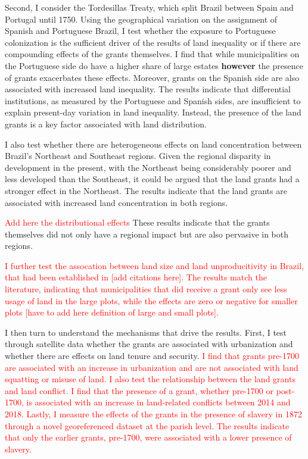 \documentclass[11pt]{article}
\newcommand{\red}[1]{\textcolor{red}{#1}}
\begin{document}
Second, I consider the Tordesillas Treaty, which split Brazil between Spain and Portugal until 1750. 
Using the geographical variation on the assignment of Spanish and Portuguese Brazil, I test whether the exposure to Portuguese colonization is the sufficient driver of the results of land inequality or if there are compounding effects of the grants themselves.
I find that while municipalities on the Portuguese side do have a higher share of large estates \textbf{however} the presence of grants exacerbates these effects.
Moreover, grants on the Spanish side are also associated with increased land inequality.
The results indicate that differential institutions, as measured by the Portuguese and Spanish sides, are insufficient to explain present-day variation in land inequality. 
Instead, the presence of the land grants is a key factor associated with land distribution.

I also test whether there are heterogeneous effects on land concentration between Brazil's Northeast and Southeast regions. 
Given the regional disparity in development in the present, with the Northeast being considerably poorer and less developed than the Southeast, it could be argued that the land grants had a stronger effect in the Northeast.
The results indicate that the land grants are associated with increased land concentration in both regions. 
\begin{comment}
Pre-1700 increase the land concentration only in the Northeast, where they are associated with an increase of 5 percentage points in the share of farms over 2,000 ha.
Post-1700 grants, however, affect both regions similarly, being associated with an increase of 3 percentage points in the share of farms over 2,000 ha. 
\end{comment}
\red{Add here the distributional effects}
These results indicate that the grants themselves did not only have a regional impact but are also pervasive in both regions.

\red{I further test the assocation between land size and land unproducitivity in Brazil, that had been established in [add citations here]. The results match the literature, indicating that municipalities that did receive a grant only see less usage of land in the large plots, while the effects are zero or negative for smaller plots [have to add here definition of large and small plots].}

I then turn to understand the mechanisms that drive the results. 
First, I test through satellite data whether the grants are associated with urbanization and whether there are effects on land tenure and security.
\red{
I find that grants pre-1700 are associated with an increase in urbanization and are not associated with land squatting or misuse of land.
I also test the relationship between the land grants and land conflict.
I find that the presence of a grant, whether pre-1700 or post-1700, is associated with an increase in land-related conflicts between 2014 and 2018.
Lastly, I measure the effects of the grants in the presence of slavery in 1872 through a novel georeferenced dataset at the parish level. 
The results indicate that only the earlier grants, pre-1700, were associated with a lower presence of slavery.}
\end{document}
